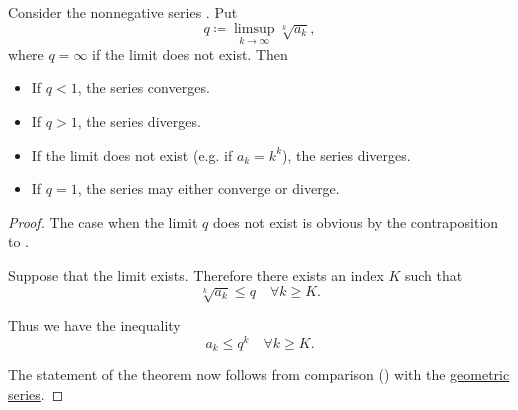 \begin{proposition}\label{thm:cauchys_root_test}\mcite\cite[thm. 3.33]{Rudin1976}
  Consider the nonnegative series . Put
  \begin{equation*}
    q \coloneqq \limsup_{k \to \infty} \sqrt[k]{a_k},
  \end{equation*}
  where \( q = \infty \) if the limit does not exist. Then
  \begin{itemize}
    \item If \( q < 1 \), the series converges.
    \item If \( q > 1 \), the series diverges.
    \item If the limit does not exist (e.g. if \( a_k = k^k \)), the series diverges.
    \item If \( q = 1 \), the series may either converge or diverge.
  \end{itemize}
\end{proposition}
\begin{proof}
  The case when the limit \( q \) does not exist is obvious by the contraposition to .

  Suppose that the limit exists. Therefore there exists an index \( K \) such that
  \begin{equation*}
    \sqrt[k]{a_k} \leq q \quad\forall k \geq K.
  \end{equation*}

  Thus we have the inequality
  \begin{equation*}
    a_k \leq q^k \quad\forall k \geq K.
  \end{equation*}

  The statement of the theorem now follows from comparison () with the \hyperref[def:geometric_progression/series]{geometric series}.
\end{proof}

